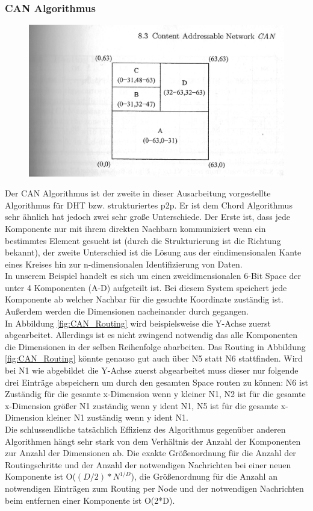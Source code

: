 \documentclass[a4paper,12pt]{scrreprt}
\begin{document}
				\subsubsection{CAN Algorithmus}
					\begin{figure}[h]
						\centering
						\includegraphics[width=0.7\linewidth]{./graphics/CAN}
						\caption{}
						\label{fig:CAN}
					\end{figure}
					Der CAN Algorithmus ist der zweite in dieser Ausarbeitung vorgestellte Algorithmus für DHT bzw. strukturiertes p2p. Er ist dem Chord Algorithmus sehr ähnlich hat jedoch zwei sehr große Unterschiede. Der Erste ist, dass jede Komponente nur mit ihrem direkten Nachbarn kommuniziert wenn ein bestimmtes Element gesucht ist (durch die Strukturierung ist die Richtung bekannt), der zweite Unterschied ist die Lösung aus der eindimensionalen Kante eines Kreises hin zur n-dimensionalen Identifizierung von Daten. \\
					In unserem Beispiel handelt es sich um einen zweidimensionalen 6-Bit Space der unter 4 Komponenten (A-D) aufgeteilt ist. Bei diesem System speichert jede Komponente ab welcher Nachbar für die gesuchte Koordinate zuständig ist. Außerdem werden die Dimensionen nacheinander durch gegangen.
					\\In Abbildung \ref{fig:CAN_Routing} wird beispielsweise die Y-Achse zuerst abgearbeitet. Allerdings ist es nicht zwingend notwendig das alle Komponenten die Dimensionen in der selben Reihenfolge abarbeiten. Das Routing in Abbildung \ref{fig:CAN_Routing} könnte genauso gut auch über N5 statt N6 stattfinden. Wird bei N1 wie abgebildet die Y-Achse zuerst abgearbeitet muss dieser nur folgende drei Einträge abspeichern um durch den gesamten Space routen zu können: N6 ist Zuständig für die gesamte x-Dimension wenn y kleiner N1, N2 ist für die gesamte x-Dimension größer N1 zuständig wenn y ident N1, N5 ist für die gesamte x-Dimension kleiner N1 zuständig wenn y ident N1.\\
					Die schlussendliche tatsächlich Effizienz des Algorithmus gegenüber anderen Algorithmen hängt sehr stark von dem Verhältnis der Anzahl der Komponenten zur Anzahl der Dimensionen ab. Die exakte Größenordnung für die Anzahl der Routingschritte und der Anzahl der notwendigen Nachrichten bei einer neuen Komponente ist O($(D/2)*N^{1/D}$), die Größenordnung für die Anzahl an notwendigen Einträgen zum Routing per Node und der notwendigen Nachrichten beim entfernen einer Komponente ist O(2*D).
\end{document}

